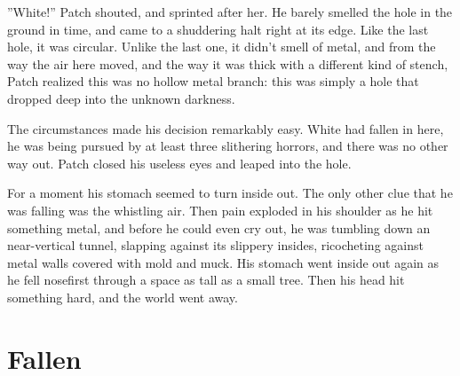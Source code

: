 \documentclass[12pt]{book}
\begin{document}
 ''White!'' Patch shouted, and sprinted after her. He barely smelled the hole in the ground in time, and came to a shuddering halt right at its edge. Like the last hole, it was circular. Unlike the last one, it didn't smell of metal, and from the way the air here moved, and the way it was thick with a different kind of stench, Patch realized this was no hollow metal branch: this was simply a hole that dropped deep into the unknown darkness.\par
 The circumstances made his decision remarkably easy. White had fallen in here, he was being pursued by at least three slithering horrors, and there was no other way out. Patch closed his useless eyes and leaped into the hole.\par
 For a moment his stomach seemed to turn inside out. The only other clue that he was falling was the whistling air. Then pain exploded in his shoulder as he hit something metal, and before he could even cry out, he was tumbling down an near-vertical tunnel, slapping against its slippery insides, ricocheting against metal walls covered with mold and muck. His stomach went inside out again as he fell nosefirst through a space as tall as a small tree. Then his head hit something hard, and the world went away.\par

\section{Fallen}
\end{document}
